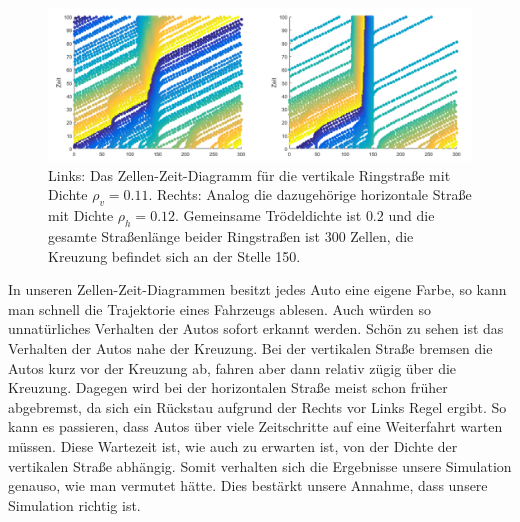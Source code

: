 \begin{figure}%
\centering
\includegraphics[width=15cm]{4_ZelleZeit.png}%
\caption{Links: Das Zellen-Zeit-Diagramm für die vertikale Ringstraße mit Dichte $\rho_v = 0.11$. Rechts: Analog die dazugehörige horizontale Straße mit Dichte $\rho_h=0.12$. Gemeinsame Trödeldichte ist $0.2$ und die gesamte Straßenlänge beider Ringstraßen ist $300$ Zellen, die Kreuzung befindet sich an der Stelle 150.  }%
\label{pic:ZelleZeit}%
\end{figure}

In unseren Zellen-Zeit-Diagrammen besitzt jedes Auto eine eigene Farbe, so kann man schnell die Trajektorie eines Fahrzeugs ablesen. Auch würden so unnatürliches Verhalten der Autos sofort erkannt werden. Schön zu sehen ist das Verhalten der Autos nahe der Kreuzung. Bei der vertikalen Straße bremsen die Autos kurz vor der Kreuzung ab, fahren aber dann relativ zügig über die Kreuzung. Dagegen wird bei der horizontalen Straße meist schon früher abgebremst, da sich ein Rückstau aufgrund der Rechts vor Links Regel ergibt. So kann es passieren, dass Autos über viele Zeitschritte auf eine Weiterfahrt warten müssen. Diese Wartezeit ist, wie auch zu erwarten ist, von der Dichte der vertikalen Straße abhängig. Somit verhalten sich die Ergebnisse unsere Simulation genauso, wie man vermutet hätte. Dies bestärkt unsere Annahme, dass unsere Simulation richtig ist.  